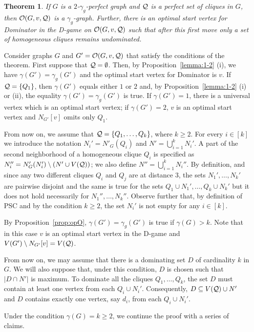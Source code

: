 \documentclass[12pt]{article}
\newtheorem{theorem}{Theorem}[section]
\newcommand{\proof}{\noindent{\bf Proof.\ }}
\newcommand{\cO}{{\cal O}}
\newcommand{\cQ}{{\cal Q}}
\begin{document}
\begin{theorem}
	\label{thm:oO-perfect}
	If $G$ is a $2$-$\gamma_g$-perfect graph and $\cQ$ is a perfect set of cliques in $G$, then  $\cO(G, v, \cQ)$  is a $\gamma_g$-graph. Further, there is an optimal start vertex for Dominator in the D-game on $\cO(G, v, \cQ)$  such that after this first move only a set of homogeneous cliques remains undominated.
\end{theorem}
\proof
Consider graphs $G$ and $G'=\cO(G,v,\cQ)$ that satisfy the conditions of the theorem. First suppose that $\cQ=\emptyset$. Then, by Proposition~\ref{lemma:1-2} (i), we have  $\gamma(G')=\gamma_g(G')$ and the optimal start vertex for Dominator is $v$.
If $\cQ=\{Q_1\}$, then $\gamma(G')$ equals either $1$ or $2$ and, by Proposition~\ref{lemma:1-2} (i) or (ii), the equality $\gamma(G')=\gamma_g(G')$ is true. If $\gamma(G')=1$, there is a universal vertex which is an optimal start vertex; if $\gamma(G')=2$, $v$ is an optimal start vertex and $N_{G'}[v]$ omits only $Q_1$.
\medskip

From now on, we assume that $\cQ=\{Q_1, \ldots, Q_k\}$, where $k\ge 2$. For every $i\in \left[k \right] $ we introduce the notation $N_i'=N'_{G}(Q_i) $ and $N'=\bigcup_{i=1}^k N_i'$. A part of the second neighborhood of a homogeneous clique $Q_i$ is specified as $N_i''=N'_{G}(N_i')\setminus (N'\cup V(\cQ))$; we also define $N''=\bigcup_{i=1}^kN_i''$. By definition, and since any two different cliques $Q_i$ and $Q_j$ are at distance $3$, the sets $N_1',\dots ,N_k'$ are pairwise disjoint and the same is true for the sets $Q_1\cup N_1',\dots, Q_k\cup N_k'$ but it does not hold necessarily for $N_1'', \dots , N_k''$.  Observe further that, by definition of PSC and by the condition $k\ge 2$, the set $N_i'$ is not empty for any  $i \in \left[ k \right] $.


 By Proposition~\ref{prop:opO}, $\gamma(G')=\gamma_g(G')$ is true if $\gamma(G) > k$. Note that in this case $v$ is an optimal start vertex in the D-game and $V(G')\setminus N_{G'}[v]=V(\cQ)$.
 \medskip
 
 From now on, we may assume that there is a dominating set $D$ of cardinality $k$ in $G$. We will also suppose that, under this condition, $D$ is chosen such that $|D\cap N'|$ is maximum. To dominate all the cliques $Q_1, \dots, Q_k$, the set $D$ must contain at least one vertex from each  $Q_i\cup N_i'$. Consequently, $D \subseteq V(\cQ) \cup N' $ and $D$ contains exactly one vertex, say $d_i$, from each $Q_i\cup N_i'$. 

Under the condition $\gamma(G)=k \ge 2$, we continue the proof with a series of claims.
\end{document}
